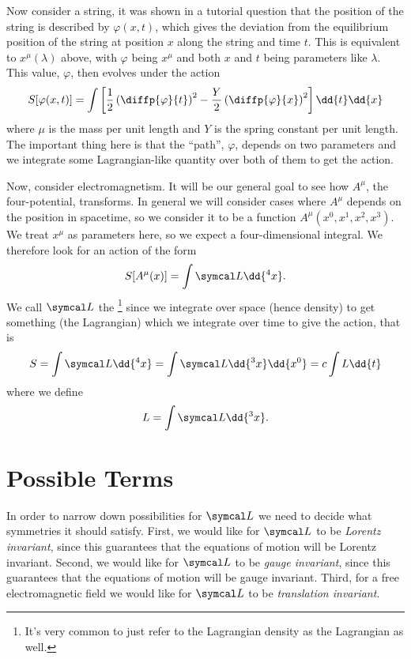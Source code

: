 Now consider a string, it was shown in a tutorial question that the position of the string is described by \(\varphi(x, t)\), which gives the deviation from the equilibrium position of the string at position \(x\) along the string and time \(t\).
This is equivalent to \(x^\mu(\lambda)\) above, with \(\varphi\) being \(x^\mu\) and both \(x\) and \(t\) being parameters like \(\lambda\).
This value, \(\varphi\), then evolves under the action
\begin{equation}
    S[\varphi(x, t)] = \int \left[ \frac{1}{2}\left( \diffp{\varphi}{t} \right)^2 - \frac{Y}{2}\left( \diffp{\varphi}{x} \right)^2 \right] \dd{t} \dd{x}
\end{equation}
where \(\mu\) is the mass per unit length and \(Y\) is the spring constant per unit length.
The important thing here is that the \enquote{path}, \(\varphi\), depends on two parameters and we integrate some Lagrangian-like quantity over both of them to get the action.

Now, consider electromagnetism.
It will be our general goal to see how \(A^\mu\), the four-potential, transforms.
In general we will consider cases where \(A^\mu\) depends on the position in spacetime, so we consider it to be a function \(A^\mu(x^0, x^1, x^2, x^3)\).
We treat \(x^\mu\) as parameters here, so we expect a four-dimensional integral.
We therefore look for an action of the form
\begin{equation}
    S[A^\mu(x)] = \int \lagrangianDensity \dd{^4x}.
\end{equation}
We call \(\lagrangianDensity\) the \footnote{It's very common to just refer to the Lagrangian density as the Lagrangian as well.} since we integrate over space (hence density) to get something (the Lagrangian) which we integrate over time to give the action, that is
\begin{equation}
    S = \int \lagrangianDensity \dd{^4x} = \int \lagrangianDensity \dd{^3 x} \dd{x^0} = c \int \lagrangian \dd{t}
\end{equation}
where we define
\begin{equation}
    \lagrangian = \int \lagrangianDensity \dd{^3x}.
\end{equation}

\section{Possible Terms}
In order to narrow down possibilities for \(\lagrangianDensity\) we need to decide what symmetries it should satisfy.
First, we would like for \(\lagrangianDensity\) to be \emph{Lorentz invariant}, since this guarantees that the equations of motion will be Lorentz invariant.
Second, we would like for \(\lagrangianDensity\) to be \emph{gauge invariant}, since this guarantees that the equations of motion will be gauge invariant.
Third, for a free electromagnetic field we would like for \(\lagrangianDensity\) to be \emph{translation invariant}.

